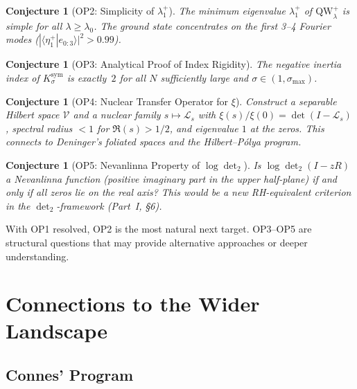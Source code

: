 \documentclass[12pt,a4paper]{article}
\newtheorem{conjecture}[theorem]{Conjecture}
\theoremstyle{definition}
\theoremstyle{remark}
\newcommand{\Ksym}{K_\sigma^{\mathrm{sym}}}
\begin{document}
\begin{conjecture}[OP2: Simplicity of $\lambda_1^+$]
\label{conj:OP2}
The minimum eigenvalue $\lambda_1^+$ of $\mathrm{QW}_\lambda^+$ is simple for all $\lambda \geq \lambda_0$. The ground state concentrates on the first 3--4 Fourier modes ($|\langle \eta_1^+ | e_{0:3} \rangle|^2 > 0.99$).
\end{conjecture}

\begin{conjecture}[OP3: Analytical Proof of Index Rigidity]
\label{conj:OP3}
The negative inertia index of $\Ksym$ is exactly~$2$ for all $N$ sufficiently large and $\sigma \in (1, \sigma_{\max})$.
\end{conjecture}

\begin{conjecture}[OP4: Nuclear Transfer Operator for $\xi$]
\label{conj:OP4}
Construct a separable Hilbert space $\mathcal{V}$ and a nuclear family $s \mapsto \mathcal{L}_s$ with $\xi(s)/\xi(0) = \det(I - \mathcal{L}_s)$, spectral radius $< 1$ for $\Re(s) > 1/2$, and eigenvalue $1$ at the zeros. This connects to Deninger's foliated spaces and the Hilbert--P\'olya program.
\end{conjecture}

\begin{conjecture}[OP5: Nevanlinna Property of $\log\det_2$]
\label{conj:OP5}
Is $\log\det_2(I - zR)$ a Nevanlinna function (positive imaginary part in the upper half-plane) if and only if all zeros lie on the real axis? This would be a new RH-equivalent criterion in the $\det_2$-framework (Part~I, \S6).
\end{conjecture}

\noindent With OP1 resolved, OP2 is the most natural next target. OP3--OP5 are structural questions that may provide alternative approaches or deeper understanding.


\section{Connections to the Wider Landscape}
\label{sec:connections}

\subsection{Connes' Program}
\end{document}
